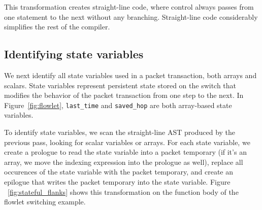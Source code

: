 This transformation creates straight-line code, where control always passes
from one statement to the next without any branching. Straight-line code
considerably simplifies the rest of the compiler.

\subsection{Identifying state variables}

We next identify all state variables used in a packet transaction, both arrays
and scalars. State variables represent persistent state stored on the switch
that modifies the behavior of the packet transaction from one step to the next.
In Figure~\ref{fig:flowlet}, \texttt{last\_time} and \texttt{saved\_hop} are
both array-based state variables.


To identify state variables, we scan the straight-line AST produced by the
previous pass, looking for scalar variables or arrays. For each state variable,
we create a prologue to read the state variable into a packet temporary (if
it's an array, we move the indexing expression into the prologue as well),
replace all occurences of the state variable with the packet temporary, and
create an epilogue that writes the packet temporary into the state variable.
Figure ~\ref{fig:stateful_flanks} shows this transformation on the function
body of the flowlet switching example.

